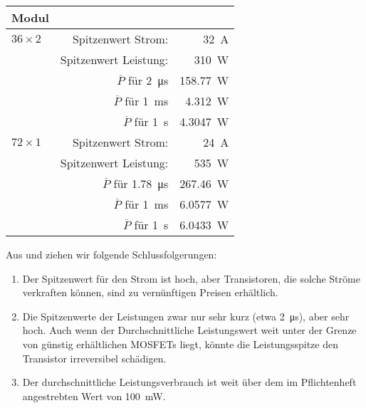 \begin{table}[h!tb]
\begin{tabular}{lrr}
    \toprule
    Modul \\
    \midrule
    $36 \times 2$ & Spitzenwert Strom:                            & \SI{32}{\ampere} \\
                  & Spitzenwert Leistung:                         & \SI{310}{\watt}  \\
                  & $\overline{P}$ f\"ur \SI{2}{\micro\second}    & \SI{158.77}{\watt} \\
                  & $\overline{P}$ f\"ur \SI{1}{\milli\second}    & \SI{4.312}{\watt}  \\
                  & $\overline{P}$ f\"ur \SI{1}{\second}          & \SI{4.3047}{\watt} \\
    \midrule
    $72 \times 1$ & Spitzenwert Strom:                            & \SI{24}{\ampere} \\
                  & Spitzenwert Leistung:                         & \SI{535}{\watt}  \\
                  & $\overline{P}$ f\"ur \SI{1.78}{\micro\second} & \SI{267.46}{\watt} \\
                  & $\overline{P}$ f\"ur \SI{1}{\milli\second}    & \SI{6.0577}{\watt}  \\
                  & $\overline{P}$ f\"ur \SI{1}{\second}          & \SI{6.0433}{\watt} \\
    \bottomrule
    \end{tabular}
\end{table}

Aus     und     ziehen  wir
folgende  Schlussfolgerungen:

\begin{enumerate}
    \firmlist
    \item
        Der  Spitzenwert f\"ur  den  Strom ist  hoch,  aber Transistoren,  die
        solche Str\"ome  verkraften k\"onnen,  sind zu  vern\"unftigen Preisen
        erh\"altlich.
    \item
        Die    Spitzenwerte    der    Leistungen   zwar    nur    sehr    kurz
        (etwa   \SI{2}{\micro\second}),   aber   sehr  hoch. Auch   wenn   der
        Durchschnittliche Leistungswert  weit unter  der Grenze  von g\"unstig
        erh\"altlichen  MOSFETs   liegt,  k\"onnte  die   Leistungsspitze  den
        Transistor irreversibel sch\"adigen.
    \item
        Der  durchschnittliche  Leistungsverbrauch  ist  weit  \"uber  dem  im
        Pflichtenheft angestrebten Wert von \SI{100}{\milli\watt}.
\end{enumerate}

